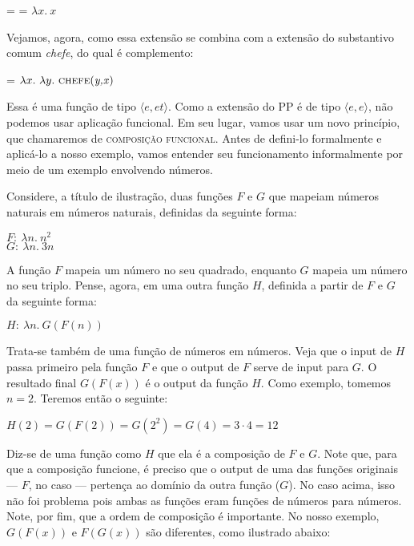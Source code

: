 \begin{exe}
	\ex {} =  = $\lambda x.\ x$
\end{exe}

\n Vejamos, agora, como essa extensão se combina com a extensão do substantivo comum \textit{chefe}, do qual é complemento:

\begin{exe}
	\ex {} = $\lambda x.\ \lambda y.\ \predica{chefe}{y,x}$
\end{exe}

\n Essa é uma função de tipo $\langle e,et\rangle$. Como a extensão do PP é de tipo $\langle e,e\rangle$, não podemos usar aplicação funcional. Em seu lugar, vamos usar um novo princípio, que chamaremos de \textsc{composição funcional}. Antes de defini-lo formalmente e aplicá-lo a nosso exemplo, vamos entender seu funcionamento informalmente por meio de um exemplo envolvendo números.

Considere, a título de ilustração, duas funções $F$ e $G$ que mapeiam números naturais em números naturais, definidas da seguinte forma:

\begin{exe}
	\ex $F:\ \lambda n.\ n^{2}$ \\
   		$G:\ \lambda n.\ 3n$
\end{exe}
   
\n A função $F$ mapeia um número no seu quadrado, enquanto $G$ mapeia um número no seu triplo. Pense, agora, em uma outra função $H$, definida a partir de $F$ e $G$ da seguinte forma:

\begin{exe}
	\ex $H:\ \lambda n.\ G(F(n))$
\end{exe} 

\n Trata-se também de uma função de números em números. Veja que o input de $H$ passa primeiro pela função $F$ e que o output de $F$ serve de input para $G$. O resultado final $G(F(x))$ é o output da função $H$. Como exemplo, tomemos $n=2$. Teremos então o seguinte:

\begin{exe}
	\ex $H(2) = G(F(2)) = G(2^{2}) = G(4) = 3 \cdot 4 = 12$
\end{exe}

\n Diz-se de uma função como $H$ que ela é a composição de $F$ e $G$. Note que, para que a composição funcione, é preciso que o output de uma das funções originais --- $F$, no caso --- pertença ao domínio da outra função ($G$). No caso acima, isso não foi problema pois ambas as funções eram funções de números para números. Note, por fim, que a ordem de composição é importante. No nosso exemplo, $G(F(x))$ e $F(G(x))$ são diferentes, como ilustrado abaixo:

